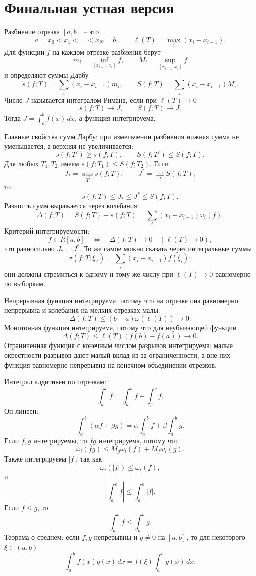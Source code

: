 \documentclass[12pt,a4paper]{article}
\newcommand{\dd}{\,d}
\newcommand{\mesh}{\ell}
\newcommand{\osc}{\omega}
\begin{document}
\section*{Финальная устная версия}

Разбиение отрезка \([a,b]\) -- это
\[
  a=x_0<x_1<\dots<x_N=b,\qquad
  \mesh(T)=\max_i(x_i-x_{i-1}).
\]
Для функции \(f\) на каждом отрезке разбиения берут
\[
  m_i=\inf_{[x_{i-1},x_i]}f,\qquad
  M_i=\sup_{[x_{i-1},x_i]}f
\]
и определяют суммы Дарбу
\[
  s(f;T)=\sum_i (x_i-x_{i-1})m_i,\qquad
  S(f;T)=\sum_i (x_i-x_{i-1})M_i.
\]
Число \(J\) называется интегралом Римана, если при \(\mesh(T)\to0\)
\[
  s(f;T)\to J,\qquad S(f;T)\to J.
\]
Тогда \(J=\int_a^b f(x)\dd x\), а функция интегрируема.

Главные свойства сумм Дарбу: при измельчении разбиения нижняя сумма не
уменьшается, а верхняя не увеличивается:
\[
  s(f;T')\ge s(f;T),\qquad S(f;T')\le S(f;T).
\]
Для любых \(T_1,T_2\) имеем \(s(f;T_1)\le S(f;T_2)\). Если
\[
  J_*=\sup_T s(f;T),\qquad J^*=\inf_T S(f;T),
\]
то
\[
  s(f;T)\le J_*\le J^*\le S(f;T).
\]
Разность сумм выражается через колебания:
\[
  \Delta(f;T)=S(f;T)-s(f;T)
  =
  \sum_i (x_i-x_{i-1})\osc_i(f).
\]
Критерий интегрируемости:
\[
  f\in R[a,b]\quad\Longleftrightarrow\quad
  \Delta(f;T)\to0\quad(\mesh(T)\to0),
\]
что равносильно \(J_*=J^*\). То же самое можно сказать через интегральные
суммы
\[
  \sigma(f;T;\xi_T)=\sum_i (x_i-x_{i-1})f(\xi_i):
\]
они должны стремиться к одному и тому же числу при \(\mesh(T)\to0\) равномерно
по выборкам.

Непрерывная функция интегрируема, потому что на отрезке она равномерно
непрерывна и колебания на мелких отрезках малы:
\[
  \Delta(f;T)\le (b-a)\omega(\mesh(T))\to0.
\]
Монотонная функция интегрируема, потому что для неубывающей функции
\[
  \Delta(f;T)\le \mesh(T)(f(b)-f(a))\to0.
\]
Ограниченная функция с конечным числом разрывов интегрируема: малые
окрестности разрывов дают малый вклад из-за ограниченности, а вне них функция
равномерно непрерывна на конечном объединении отрезков.

Интеграл аддитивен по отрезкам:
\[
  \int_a^c f=\int_a^b f+\int_b^c f.
\]
Он линеен:
\[
  \int_a^b(\alpha f+\beta g)=
  \alpha\int_a^b f+\beta\int_a^b g.
\]
Если \(f,g\) интегрируемы, то \(fg\) интегрируема, потому что
\[
  \osc_i(fg)\le M_g\osc_i(f)+M_f\osc_i(g).
\]
Также интегрируема \(|f|\), так как
\[
  \osc_i(|f|)\le\osc_i(f),
\]
и
\[
  \left|\int_a^b f\right|\le \int_a^b |f|.
\]
Если \(f\le g\), то
\[
  \int_a^b f\le\int_a^b g.
\]
Теорема о среднем: если \(f,g\) непрерывны и \(g\ne0\) на \([a,b]\), то для
некоторого \(\xi\in(a,b)\)
\[
  \int_a^b f(x)g(x)\dd x=f(\xi)\int_a^b g(x)\dd x.
\]
\end{document}
